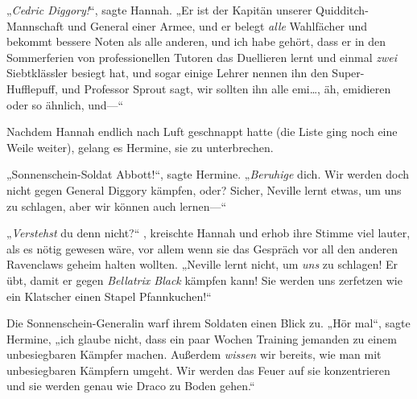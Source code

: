 „\emph{Cedric Diggory!}“, sagte Hannah. „Er ist der Kapitän unserer Quidditch-Mannschaft und General einer Armee, und er belegt \emph{alle} Wahlfächer und bekommt bessere Noten als alle anderen, und ich habe gehört, dass er in den Sommerferien von professionellen Tutoren das Duellieren lernt und einmal \emph{zwei} Siebtklässler besiegt hat, und sogar einige Lehrer nennen ihn den Super-Hufflepuff, und Professor Sprout sagt, wir sollten ihn alle emi…, äh, emidieren oder so ähnlich, und—“

Nachdem Hannah endlich nach Luft geschnappt hatte (die Liste ging noch eine Weile weiter), gelang es Hermine, sie zu unterbrechen.

„Sonnenschein-Soldat Abbott!“, sagte Hermine. „\emph{Beruhige} dich. Wir werden doch nicht gegen General Diggory kämpfen, oder? Sicher, Neville lernt etwas, um uns zu schlagen, aber wir können auch lernen—“

„\emph{Verstehst} du denn nicht?“ , kreischte Hannah und erhob ihre Stimme viel lauter, als es nötig gewesen wäre, vor allem wenn sie das Gespräch vor all den anderen Ravenclaws geheim halten wollten. „Neville lernt nicht, um \emph{uns} zu schlagen! Er übt, damit er gegen \emph{Bellatrix Black} kämpfen kann! Sie werden uns zerfetzen wie ein Klatscher einen Stapel Pfannkuchen!“

Die Sonnenschein-Generalin warf ihrem Soldaten einen Blick zu. „Hör mal“, sagte Hermine, „ich glaube nicht, dass ein paar Wochen Training jemanden zu einem unbesiegbaren Kämpfer machen. Außerdem \emph{wissen} wir bereits, wie man mit unbesiegbaren Kämpfern umgeht. Wir werden das Feuer auf sie konzentrieren und sie werden genau wie Draco zu Boden gehen.“

